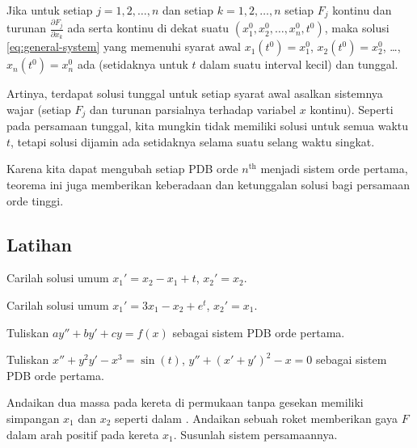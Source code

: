 \begin{theorem}%
\label{sys:picardthm}%
Jika untuk setiap $j=1,2,\ldots,n$ dan setiap
$k = 1,2,\ldots,n$
setiap $F_j$ kontinu
dan turunan
$\frac{\partial F_j}{\partial x_k}$ ada serta
kontinu di dekat suatu $(x_1^0,x_2^0,\ldots,x_n^0,t^0)$, maka solusi
\eqref{eq:general-system}
yang memenuhi syarat awal
$x_1(t^0) = x_1^0$,
$x_2(t^0) = x_2^0$, \ldots,
$x_n(t^0) = x_n^0$
ada (setidaknya untuk $t$ dalam suatu interval kecil) dan tunggal.
\end{theorem}

Artinya, terdapat solusi tunggal untuk setiap syarat awal
asalkan sistemnya wajar (setiap $F_j$ dan turunan parsialnya
terhadap variabel $x$ kontinu).  Seperti pada persamaan tunggal,
kita mungkin tidak memiliki solusi untuk semua waktu $t$, tetapi solusi
dijamin ada setidaknya selama suatu
selang waktu singkat.

Karena kita dapat mengubah setiap PDB orde $n^{\text{th}}$ menjadi
sistem orde pertama,
teorema ini juga memberikan
keberadaan dan ketunggalan solusi bagi persamaan orde tinggi.

\subsection{Latihan}

\begin{exercise}
Carilah solusi umum $x_1' = x_2 - x_1 + t$, $x_2' = x_2$.
\end{exercise}

\begin{exercise}
Carilah solusi umum $x_1' = 3 x_1 - x_2 + e^t$, $x_2' = x_1$.
\end{exercise}

\begin{exercise}
Tuliskan $ay'' + by' + cy = f(x)$
sebagai sistem PDB orde pertama.
\end{exercise}

\begin{exercise}
Tuliskan $x'' + y^2 y' - x^3 = \sin(t)$,
$y'' + {(x'+y')}^2 -x = 0$ sebagai sistem PDB orde pertama.
\end{exercise}

\begin{exercise}
Andaikan dua massa pada kereta di permukaan tanpa gesekan memiliki
simpangan $x_1$ dan $x_2$ seperti dalam .
Andaikan sebuah roket memberikan gaya $F$ dalam arah positif pada kereta
$x_1$.  Susunlah sistem persamaannya.
\end{exercise}

